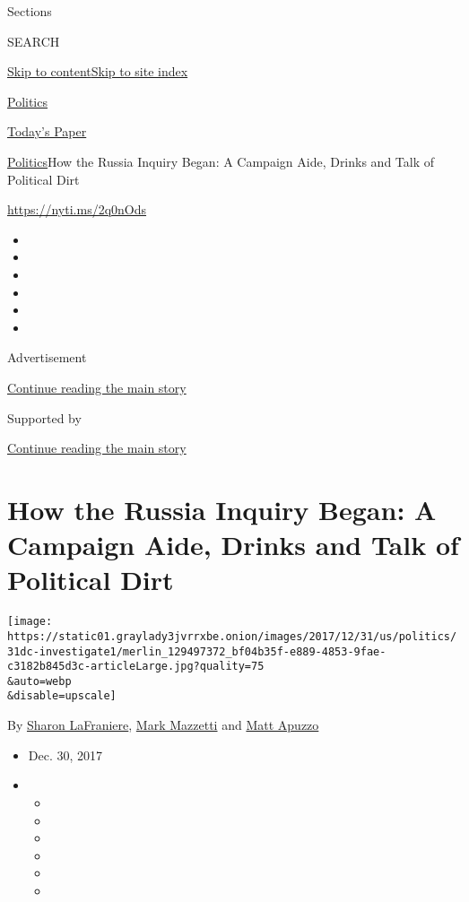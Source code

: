 Sections

SEARCH

\protect\hyperlink{site-content}{Skip to
content}\protect\hyperlink{site-index}{Skip to site index}

\href{https://www.nytimes3xbfgragh.onion/section/politics}{Politics}

\href{https://myaccount.nytimes3xbfgragh.onion/auth/login?response_type=cookie\&client_id=vi}{}

\href{https://www.nytimes3xbfgragh.onion/section/todayspaper}{Today's
Paper}

\href{/section/politics}{Politics}\textbar{}How the Russia Inquiry
Began: A Campaign Aide, Drinks and Talk of Political Dirt

\url{https://nyti.ms/2q0nOds}

\begin{itemize}
\item
\item
\item
\item
\item
\item
\end{itemize}

Advertisement

\protect\hyperlink{after-top}{Continue reading the main story}

Supported by

\protect\hyperlink{after-sponsor}{Continue reading the main story}

\hypertarget{how-the-russia-inquiry-began-a-campaign-aide-drinks-and-talk-of-political-dirt}{%
\section{How the Russia Inquiry Began: A Campaign Aide, Drinks and Talk
of Political
Dirt}\label{how-the-russia-inquiry-began-a-campaign-aide-drinks-and-talk-of-political-dirt}}

\texttt{[image: https://static01.graylady3jvrrxbe.onion/images/2017/12/31/us/politics/31dc-investigate1/merlin\_129497372\_bf04b35f-e889-4853-9fae-c3182b845d3c-articleLarge.jpg?quality=75\\\&auto=webp\\\&disable=upscale]}

By \href{https://www.nytimes3xbfgragh.onion/by/sharon-lafraniere}{Sharon
LaFraniere},
\href{https://www.nytimes3xbfgragh.onion/by/mark-mazzetti}{Mark
Mazzetti} and
\href{https://www.nytimes3xbfgragh.onion/by/matt-apuzzo}{Matt Apuzzo}

\begin{itemize}
\item
  Dec. 30, 2017
\item
  \begin{itemize}
  \item
  \item
  \item
  \item
  \item
  \item
  \end{itemize}
\end{itemize}

